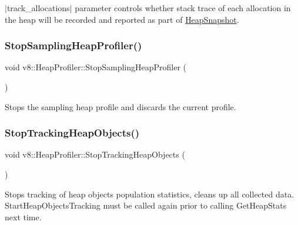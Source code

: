 $\vert$track\+\_\+allocations$\vert$ parameter controls whether stack trace of each allocation in the heap will be recorded and reported as part of \mbox{\hyperlink{classv8_1_1HeapSnapshot}{Heap\+Snapshot}}. \mbox{\label{classv8_1_1HeapProfiler_abc43e12e6febb087be251c0629ff17bf}} 
\subsubsection{\texorpdfstring{Stop\+Sampling\+Heap\+Profiler()}{StopSamplingHeapProfiler()}}
{\footnotesize\ttfamily void v8\+::\+Heap\+Profiler\+::\+Stop\+Sampling\+Heap\+Profiler (\begin{DoxyParamCaption}{ }\end{DoxyParamCaption})}

Stops the sampling heap profile and discards the current profile. \mbox{\label{classv8_1_1HeapProfiler_ae448d9474ae34781133d4a4547b08cb1}} 
\subsubsection{\texorpdfstring{Stop\+Tracking\+Heap\+Objects()}{StopTrackingHeapObjects()}}
{\footnotesize\ttfamily void v8\+::\+Heap\+Profiler\+::\+Stop\+Tracking\+Heap\+Objects (\begin{DoxyParamCaption}{ }\end{DoxyParamCaption})}

Stops tracking of heap objects population statistics, cleans up all collected data. Start\+Heap\+Objects\+Tracking must be called again prior to calling Get\+Heap\+Stats next time. \mbox{\label{classv8_1_1HeapProfiler_a9df0b9a5dedcfc0ac796724cca36e7d7}} 

